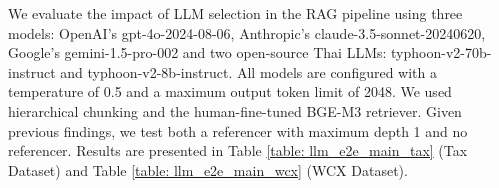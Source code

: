 We evaluate the impact of LLM selection in the RAG pipeline using three models: OpenAI's gpt-4o-2024-08-06, Anthropic's claude-3.5-sonnet-20240620, Google's gemini-1.5-pro-002 and two open-source Thai LLMs: typhoon-v2-70b-instruct and typhoon-v2-8b-instruct. All models are configured with a temperature of 0.5 and a maximum output token limit of 2048. We used hierarchical chunking and the human-fine-tuned BGE-M3 retriever. Given previous findings, we test both a referencer with maximum depth 1 and no referencer. Results are presented in Table \ref{table: llm_e2e_main_tax} (Tax Dataset) and Table \ref{table: llm_e2e_main_wcx} (WCX Dataset).

\begin{table}[ht]
\centering
\caption{Effect of LLM configuration on E2E performance on Tax Dataset}
\renewcommand{\arraystretch}{1.5} %
\label{table: llm_e2e_main_tax}
\end{table}
